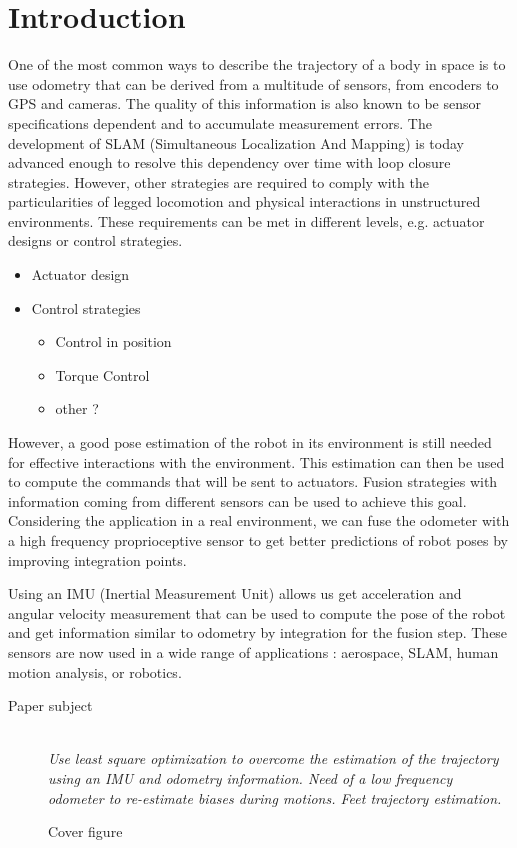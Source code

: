 
\section{Introduction}\label{sec:intro}

One of the most common ways to describe the trajectory of a body in space is to use odometry that can be derived from a multitude of sensors, from encoders to GPS and cameras.
The quality of this information is also known to be sensor specifications dependent and to accumulate measurement errors. The development of SLAM (Simultaneous Localization And Mapping) is today advanced enough to resolve 
this dependency over time with loop closure strategies. However, other strategies are required to comply with the particularities of legged locomotion and physical interactions in unstructured environments. These requirements can be met in 
different levels, e.g. actuator designs or control strategies.

  \begin{itemize}
   \item Actuator design  \cite{wensing2017proprioceptive}
   \item Control strategies
    \begin{itemize}
     \item Control in position
     \item Torque Control
     \item other ?
    \end{itemize}
  \end{itemize}

However, a good pose estimation of the robot in its environment is still needed for effective interactions with the environment. This estimation can then be used to compute the commands that will be sent to actuators.
Fusion strategies with information coming from different sensors can be used to achieve this goal. Considering the application in a real environment, we can fuse the odometer with a high frequency proprioceptive sensor 
to get better predictions of robot poses by improving integration points.

Using an IMU (Inertial Measurement Unit) allows us get acceleration and angular velocity measurement that can be used to compute the pose of the robot and get information similar to odometry by integration for the fusion step.
These sensors are now used in a wide range of applications : aerospace, SLAM, human motion analysis, or robotics.


\begin{description}
 \item [Paper subject] \hfill \\ \textit{Use least square optimization to overcome the estimation of the trajectory using an IMU and odometry information. Need of a low frequency odometer to re-estimate biases during motions. Feet trajectory estimation.}
\end{description}


\begin{figure}
\centering
	\caption{Cover figure}
	\label{fig:cover}
\end{figure}

